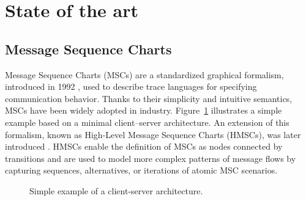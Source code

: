 \section{State of the art}\label{sec:sota}

\subsection{Message Sequence Charts}
Message Sequence Charts (MSCs) are a standardized graphical formalism,
introduced in 1992 \cite{MSCStandard}, used to describe trace languages for specifying
communication behavior. Thanks to their simplicity and intuitive
semantics, MSCs have been widely adopted in industry.
Figure~\ref{fig:msc-cli-ser} illustrates a simple example based on a
minimal client–server architecture. An extension of this formalism,
known as High-Level Message Sequence Charts (HMSCs), was later
introduced \cite{HMSCStandard}. HMSCs enable the definition of
MSCs as nodes connected by transitions and are used to model more
complex patterns of message flows by capturing sequences, alternatives,
or iterations of atomic MSC scenarios.

\begin{figure}[!ht]
\centering
\begin{msc}[draw frame=none, draw head=none, msc keyword=, head height=0px, label distance=0.5ex, foot height=0px, foot distance=0px]{}

	\nextlevel
\end{msc}
\caption{Simple example of a client-server architecture.}
\label{fig:msc-cli-ser}
\end{figure}

